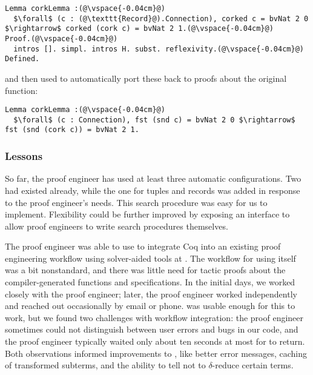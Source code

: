 \begin{lstlisting}
Lemma corkLemma :(@\vspace{-0.04cm}@)
  $\forall$ (c : (@\texttt{Record}@).Connection), corked c = bvNat 2 0 $\rightarrow$ corked (cork c) = bvNat 2 1.(@\vspace{-0.04cm}@)
Proof.(@\vspace{-0.04cm}@)
  intros []. simpl. intros H. subst. reflexivity.(@\vspace{-0.04cm}@)
Defined.
\end{lstlisting} %
and then used \toolname to automatically port these back to proofs about the original function:

\begin{lstlisting}[backgroundcolor=\color{cyan!30}]
Lemma corkLemma :(@\vspace{-0.04cm}@)
  $\forall$ (c : Connection), fst (snd c) = bvNat 2 0 $\rightarrow$ fst (snd (cork c)) = bvNat 2 1.
\end{lstlisting} %

\subsubsection{Lessons}

So far, the proof engineer has used at least three automatic configurations.
Two had existed already, while the one for tuples and records was
added in response to the proof engineer's needs.
This search procedure was easy for us to implement. %
Flexibility could be further improved by exposing an interface to allow proof engineers to
write search procedures themselves.

The proof engineer was able to use \toolname to integrate Coq into an existing proof engineering
workflow using solver-aided tools at \company.
The workflow for using \toolname itself was a bit nonstandard,
and there was little need for tactic proofs about the compiler-generated functions and specifications.
In the initial days, we worked closely with the proof engineer;
later, the proof engineer worked independently and reached out occasionally by email or phone.
\toolname was usable enough for this to work, but we found two challenges with workflow integration:
the proof engineer sometimes could not distinguish between user errors and bugs in our code,
and the proof engineer typically waited only about ten seconds at most for \toolname to return.
Both observations informed improvements to \toolname, like better error messages, caching of transformed subterms,
and the ability to tell \toolname not to $\delta$-reduce certain terms.

